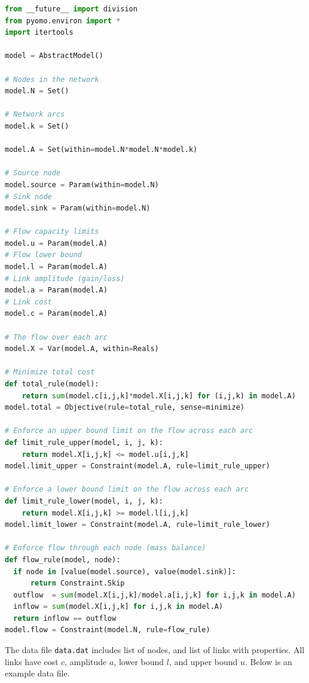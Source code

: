 \documentclass[12pt]{article}%
\begin{document}
\begin{lstlisting}[language=Python]
from __future__ import division 
from pyomo.environ import *
import itertools

model = AbstractModel()

# Nodes in the network
model.N = Set()

# Network arcs
model.k = Set()

model.A = Set(within=model.N*model.N*model.k)

# Source node
model.source = Param(within=model.N)
# Sink node
model.sink = Param(within=model.N)

# Flow capacity limits
model.u = Param(model.A)
# Flow lower bound
model.l = Param(model.A)
# Link amplitude (gain/loss)
model.a = Param(model.A)
# Link cost
model.c = Param(model.A)

# The flow over each arc
model.X = Var(model.A, within=Reals)

# Minimize total cost
def total_rule(model):
    return sum(model.c[i,j,k]*model.X[i,j,k] for (i,j,k) in model.A)
model.total = Objective(rule=total_rule, sense=minimize)

# Enforce an upper bound limit on the flow across each arc
def limit_rule_upper(model, i, j, k):
    return model.X[i,j,k] <= model.u[i,j,k]
model.limit_upper = Constraint(model.A, rule=limit_rule_upper)

# Enforce a lower bound limit on the flow across each arc
def limit_rule_lower(model, i, j, k):
    return model.X[i,j,k] >= model.l[i,j,k]
model.limit_lower = Constraint(model.A, rule=limit_rule_lower)

# Enforce flow through each node (mass balance)
def flow_rule(model, node):
  if node in [value(model.source), value(model.sink)]:
      return Constraint.Skip
  outflow  = sum(model.X[i,j,k]/model.a[i,j,k] for i,j,k in model.A)
  inflow = sum(model.X[i,j,k] for i,j,k in model.A)
  return inflow == outflow
model.flow = Constraint(model.N, rule=flow_rule)
\end{lstlisting}
%
\par The data file {\tt data.dat} includes list of nodes, and list of links with properties. All links have cost $c$, amplitude $a$, lower bound $l$, and upper bound $u$. Below is an example data file.
%
\end{document}

